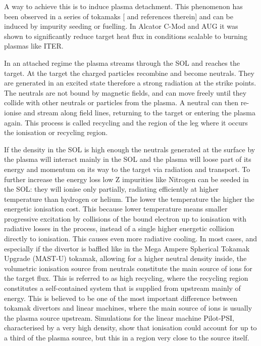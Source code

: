 A way to achieve this is to induce plasma detachment. This phenomenon has been observed in a series of tokamaks [\cite{Reimold2015} and references therein] and can be induced by impurity seeding or fuelling. In Alcator C-Mod \cite{Lipschultz2007} and AUG \cite{Kallenbach2015a} it was shown to significantly reduce target heat flux in conditions scalable to burning plasmas like ITER.

In an attached regime the plasma streams through the SOL and reaches the target. At the target the charged particles recombine and become neutrals. They are generated in an excited state therefore a strong radiation at the strike points. The neutrals are not bound by magnetic fields, and can move freely until they collide with other neutrals or particles from the plasma. A neutral can then re-ionise and stream along field lines, returning to the target or entering the plasma again. This process is called recycling and the region of the leg where it occurs the ionisation or recycling region.

If the density in the SOL is high enough the neutrals generated at the surface by the plasma will interact mainly in the SOL and the plasma will loose part of its energy and momentum on its way to the target via radiation and transport.\cite{Leonard2018} To further increase the energy loss low Z impurities like Nitrogen can be seeded in the SOL: they will ionise only partially, radiating efficiently at higher temperature than hydrogen or helium. The lower the temperature the higher the energetic ionisation cost. This because lower temperature means smaller progressive excitation by collisions of the bound electron up to ionisation with radiative losses in the process, instead of a single higher energetic collision directly to ionisation. This causes even more radiative cooling. In most cases, and especially if the divertor is baffled like in the Mega Ampere Spherical Tokamak Upgrade (MAST-U) tokamak, allowing for a higher neutral density inside, the volumetric ionisation source from neutrals constitute the main source of ions for the target flux.\cite{Krasheninnikov2016,Krasheninnikov2017a,Lipschultz1999} This is referred to as high recycling, where the recycling region constitutes a self-contained system that is supplied from upstream mainly of energy. This is believed to be one of the most important difference between tokamak divertors and linear machines, where the main source of ions is usually the plasma source upstream. Simulations for the linear machine Pilot-PSI, characterised by a very high density, show that ionisation could account for up to a third of the plasma source, but this in a region very close to the source itself.\cite{Jesko2018,Hayashi2016}

